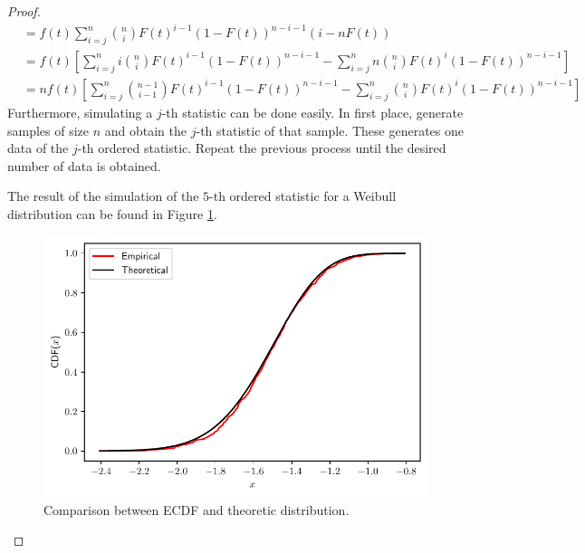 \documentclass[11pt]{article}
\theoremstyle{definition}
\theoremstyle{remark}
\theoremstyle{remark}
\begin{document}
\begin{proof}
\begin{align*}
               &= f(t) \sum_{i=j}^n \binom{n}{i}F(t)^{i-1}(1 - F(t))^{n-i-1}
                 (i - nF(t)) \\
               &= f(t) \left[\sum_{i=j}^n i\binom{n}{i} F(t)^{i-1}(1 - F(t))^{n -i-1} -
                 \sum_{i=j}^n n \binom{n}{i} F(t)^i(1 - F(t))^{n - i - 1}\right] \\
               &= nf(t) \left[\sum_{i=j}^n \binom{n-1}{i-1}F(t)^{i-1}(1 - F(t))^{n -i-1} -
                  \sum_{i=j}^n \binom{n}{i} F(t)^i(1 - F(t))^{n - i - 1}\right]
  \end{align*}
  Furthermore, simulating a $j$-th statistic can be done easily. In
  first place, generate samples of size $n$ and obtain the $j$-th
  statistic of that sample. These generates one data of the $j$-th
  ordered statistic. Repeat the previous process until the desired
  number of data is obtained.

  The result of the simulation of the $5$-th ordered statistic for a
  Weibull distribution can be found in Figure \ref{fig:ex7}.
  \begin{figure}[H]
    \centering
    \includegraphics[scale=0.5]{../figs/order.pdf}
    \caption{Comparison between ECDF and theoretic distribution.}
    \label{fig:ex7}
  \end{figure}
\end{proof}
\end{document}
